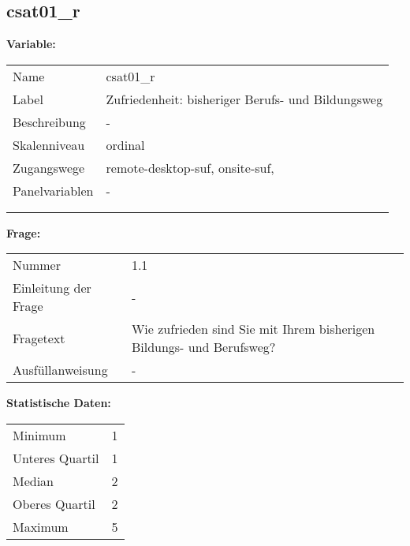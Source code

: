 	
	
	\subsection{csat01\_r}
	\label{subSection:csat01_r}

	\noindent\textbf{Variable:}\\
		\begin{tabular}{lL{11.3cm}}
			\label{tableVariable:csat01_r}
			Name & csat01\_r \\
			Label & Zufriedenheit: bisheriger Berufs- und Bildungsweg \\
			Beschreibung & - \\
			Skalenniveau & ordinal \\
			Zugangswege &
				remote-desktop-suf,
				onsite-suf,
 \\
			Panelvariablen & -
			 \\
			 \\
 \\
		\end{tabular}

		\vspace*{1 cm}
		\noindent\textbf{Frage:}\\
		\begin{tabular}{lL{11.3cm}}
			\label{tableQuestion:csat01_r}
			Nummer & 1.1 \\
			Einleitung der Frage & - \\
			Fragetext & Wie zufrieden sind Sie mit Ihrem bisherigen Bildungs- und Berufsweg? \\
			Ausfüllanweisung & - \\
		\end{tabular}


		\vspace*{1 cm}
		\noindent\textbf{Statistische Daten:}\\
			\begin{tabular}{ll}
				\label{tableStatistics:csat01_r}
					Minimum & 1 \\
					Unteres Quartil & 1 \\
					Median & 2 \\
					Oberes Quartil & 2 \\
					Maximum & 5 \\
			\end{tabular}



